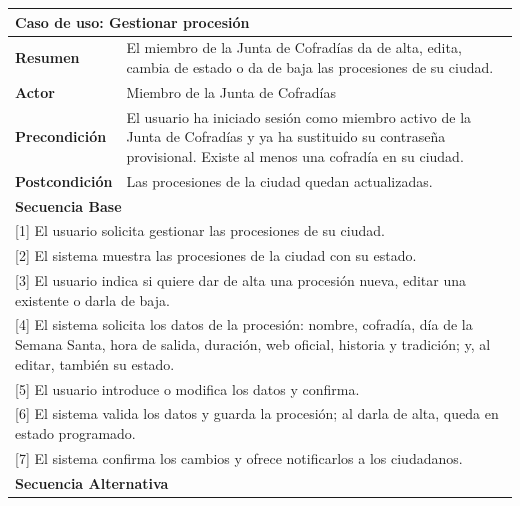 \begin{table}[h!]
    \centering
    \renewcommand{\arraystretch}{1.3}

    \begin{tabular}{|p{4cm}|p{11cm}|}
        \hline
        \multicolumn{2}{|l|}{\textbf{Caso de uso: Gestionar procesión}} \\
        \hline
        \textbf{Resumen} & El miembro de la Junta de Cofradías da de alta, edita, cambia de estado o da de baja las procesiones de su ciudad. \\
        \hline
        \textbf{Actor} & Miembro de la Junta de Cofradías \\
        \hline
        \textbf{Precondición} & El usuario ha iniciado sesión como miembro activo de la Junta de Cofradías y ya ha sustituido su contraseña provisional. Existe al menos una cofradía en su ciudad. \\
        \hline
        \textbf{Postcondición} & Las procesiones de la ciudad quedan actualizadas. \\
        \hline
        \multicolumn{2}{|l|}{\textbf{Secuencia Base}} \\
        \hline
        \multicolumn{2}{|p{15cm}|}{ [1] El usuario solicita gestionar las procesiones de su ciudad. } \\
        \hline
        \multicolumn{2}{|p{15cm}|}{ [2] El sistema muestra las procesiones de la ciudad con su estado. } \\
        \hline
        \multicolumn{2}{|p{15cm}|}{ [3] El usuario indica si quiere dar de alta una procesión nueva, editar una existente o darla de baja. } \\
        \hline
        \multicolumn{2}{|p{15cm}|}{ [4] El sistema solicita los datos de la procesión: nombre, cofradía, día de la Semana Santa, hora de salida, duración, web oficial, historia y tradición; y, al editar, también su estado. } \\
        \hline
        \multicolumn{2}{|p{15cm}|}{ [5] El usuario introduce o modifica los datos y confirma. } \\
        \hline
        \multicolumn{2}{|p{15cm}|}{ [6] El sistema valida los datos y guarda la procesión; al darla de alta, queda en estado programado. } \\
        \hline
        \multicolumn{2}{|p{15cm}|}{ [7] El sistema confirma los cambios y ofrece notificarlos a los ciudadanos. } \\
        \hline
        \multicolumn{2}{|l|}{\textbf{Secuencia Alternativa}} \\

\end{tabular}
\end{table}
